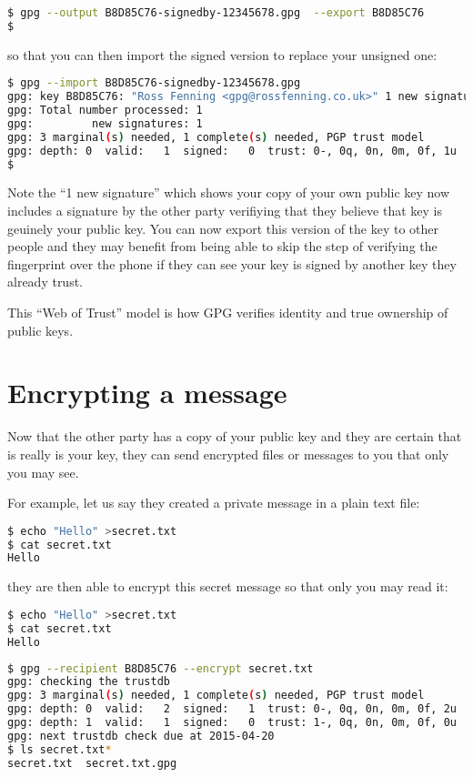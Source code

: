 \documentclass{report}
\begin{document}
\begin{lstlisting}[language=bash]
$ gpg --output B8D85C76-signedby-12345678.gpg  --export B8D85C76
$
\end{lstlisting}

\noindent so that you can then import the signed version to replace your
unsigned one:

\begin{lstlisting}[language=bash]
$ gpg --import B8D85C76-signedby-12345678.gpg
gpg: key B8D85C76: "Ross Fenning <gpg@rossfenning.co.uk>" 1 new signature
gpg: Total number processed: 1
gpg:         new signatures: 1
gpg: 3 marginal(s) needed, 1 complete(s) needed, PGP trust model
gpg: depth: 0  valid:   1  signed:   0  trust: 0-, 0q, 0n, 0m, 0f, 1u
$
\end{lstlisting}

Note the ``1 new signature'' which shows your copy of your own public key
now includes a signature by the other party verifiying that they
believe that key is geuinely your public key. You can now export this
version of the key to other people and they may benefit from being able
to skip the step of verifying the fingerprint over the phone if they
can see your key is signed by another key they already trust.

This ``Web of Trust'' model is how GPG verifies identity and true ownership
of public keys.

\section{Encrypting a message}

Now that the other party has a copy of your public key and they are certain
that is really is your key, they can send encrypted files or messages to
you that only you may see.

For example, let us say they created a private message in a plain text file:

\begin{lstlisting}[language=bash]
$ echo "Hello" >secret.txt
$ cat secret.txt 
Hello
\end{lstlisting}

they are then able to encrypt this secret message so that only you may read it:

\begin{lstlisting}[language=bash]
$ echo "Hello" >secret.txt
$ cat secret.txt 
Hello
\end{lstlisting}

\begin{lstlisting}[language=bash]
$ gpg --recipient B8D85C76 --encrypt secret.txt
gpg: checking the trustdb
gpg: 3 marginal(s) needed, 1 complete(s) needed, PGP trust model
gpg: depth: 0  valid:   2  signed:   1  trust: 0-, 0q, 0n, 0m, 0f, 2u
gpg: depth: 1  valid:   1  signed:   0  trust: 1-, 0q, 0n, 0m, 0f, 0u
gpg: next trustdb check due at 2015-04-20
$ ls secret.txt*
secret.txt  secret.txt.gpg
\end{lstlisting}
\end{document}
